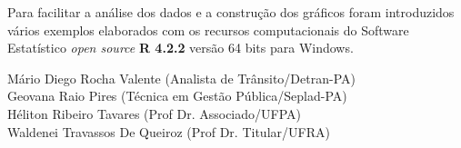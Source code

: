 Para facilitar a análise dos dados e a construção dos gráficos foram introduzidos vários exemplos elaborados com os recursos computacionais do Software Estatístico \textit{open source} \textbf{R 4.2.2} versão 64 bits para Windows. 
\vst






\vst
\vst
\vst

\begin{centering}

\vst

\vsm

Mário Diego Rocha Valente (Analista de Trânsito/Detran-PA) \\
Geovana Raio Pires (Técnica em Gestão Pública/Seplad-PA)\\
Héliton Ribeiro Tavares (Prof Dr. Associado/UFPA)\\
Waldenei Travassos De Queiroz (Prof Dr. Titular/UFRA)\\



\end{centering}
